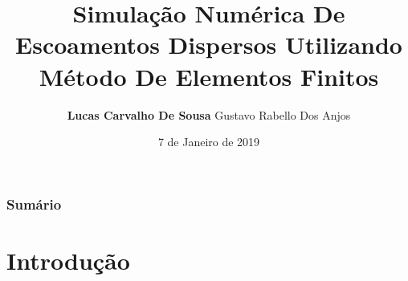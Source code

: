 \documentclass{beamer}
\title[Métodos Numéricos]{Simulação Numérica De Escoamentos Dispersos Utilizando Método De Elementos Finitos} %
\author{\textbf{Lucas Carvalho De Sousa} Gustavo Rabello Dos Anjos} %
\institute[UERJ] %
{
  Universidade do Estado do Rio de Janeiro \\ %
  \medskip
  \textit{encarvlucas@hotmail.com} %
}
\date{7 de Janeiro de 2019} %
\begin{document}
\begin{frame}
  \titlepage %
\end{frame}

\begin{frame}
  \frametitle{Sumário} %
  \tableofcontents %
\end{frame}


\section{Introdução} %
\end{document}
